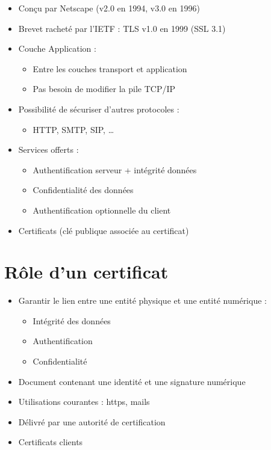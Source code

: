 \begin{itemize}
\tightlist
\item
  Conçu par Netscape (v2.0 en 1994, v3.0 en 1996)
\item
  Brevet racheté par l'IETF : TLS v1.0 en 1999 (SSL 3.1)
\item
  Couche Application :

  \begin{itemize}
  \tightlist
  \item
    Entre les couches transport et application
  \item
    Pas besoin de modifier la pile TCP/IP
  \end{itemize}
\item
  Possibilité de sécuriser d'autres protocoles :

  \begin{itemize}
  \tightlist
  \item
    HTTP, SMTP, SIP, \ldots{}
  \end{itemize}
\item
  Services offerts :

  \begin{itemize}
  \tightlist
  \item
    Authentification serveur + intégrité données
  \item
    Confidentialité des données
  \item
    Authentification optionnelle du client
  \end{itemize}
\item
  Certificats (clé publique associée au certificat)
\end{itemize}

\hypertarget{ruxf4le-dun-certificat}{%
\section{Rôle d'un certificat}\label{ruxf4le-dun-certificat}}

\begin{itemize}
\tightlist
\item
  Garantir le lien entre une entité physique et une entité numérique :

  \begin{itemize}
  \tightlist
  \item
    Intégrité des données
  \item
    Authentification
  \item
    Confidentialité
  \end{itemize}
\item
  Document contenant une identité et une signature numérique
\item
  Utilisations courantes : https, mails
\item
  Délivré par une autorité de certification
\item
  Certificats clients
\end{itemize}

